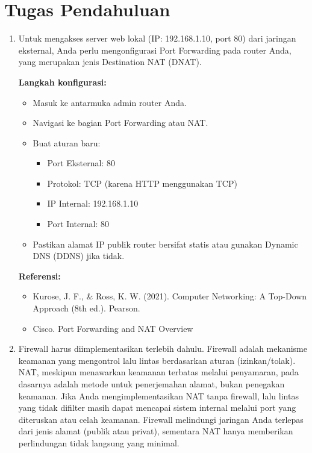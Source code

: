 \section{Tugas Pendahuluan}
\begin{enumerate}
	\item Untuk mengakses server web lokal (IP: 192.168.1.10, 
	port 80) dari jaringan eksternal, Anda perlu mengonfigurasi 
	Port Forwarding pada router Anda, yang merupakan jenis 
	Destination NAT (DNAT).

	\textbf{Langkah konfigurasi:}
	\begin{itemize}
		\item Masuk ke antarmuka admin router Anda.
		\item Navigasi ke bagian Port Forwarding atau NAT.
		\item Buat aturan baru:
		\begin{itemize}
			\item Port Eksternal: 80
			\item Protokol: TCP (karena HTTP menggunakan TCP)
			\item IP Internal: 192.168.1.10
			\item Port Internal: 80
		\end{itemize}
		\item Pastikan alamat IP publik router bersifat statis 
		atau gunakan Dynamic DNS (DDNS) jika tidak.
	\end{itemize}

	\textbf{Referensi:} 
	\begin{itemize}
		\item Kurose, J. F., \& Ross, K. W. (2021). Computer 
		Networking: A Top-Down Approach (8th ed.). Pearson.
		\item Cisco. Port Forwarding and NAT Overview
	\end{itemize}
	\item Firewall harus diimplementasikan terlebih dahulu. 
	Firewall adalah mekanisme keamanan yang mengontrol lalu 
	lintas berdasarkan aturan (izinkan/tolak). NAT, meskipun 
	menawarkan keamanan terbatas melalui penyamaran, pada 
	dasarnya adalah metode untuk penerjemahan alamat, bukan 
	penegakan keamanan. Jika Anda mengimplementasikan NAT tanpa 
	firewall, lalu lintas yang tidak difilter masih dapat 
	mencapai sistem internal melalui port yang diteruskan atau 
	celah keamanan. Firewall melindungi jaringan Anda terlepas 
	dari jenis alamat (publik atau privat), sementara NAT hanya 
	memberikan perlindungan tidak langsung yang minimal. 	


\end{enumerate}
